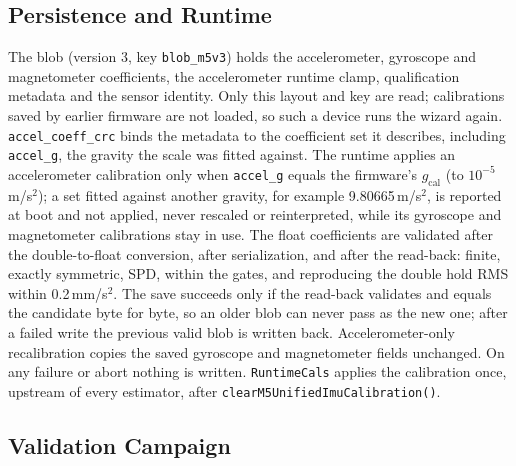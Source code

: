 \documentclass[conference]{IEEEtran}
\begin{document}
    \subsection{Persistence and Runtime}

    The blob (version 3, key \texttt{blob\_m5v3}) holds the accelerometer,
    gyroscope and magnetometer coefficients, the accelerometer runtime
    clamp, qualification metadata and the sensor identity. Only this layout
    and key are read; calibrations saved by earlier firmware are not loaded,
    so such a device runs the wizard again. \texttt{accel\_coeff\_crc} binds the metadata to the
    coefficient set it describes, including \texttt{accel\_g}, the gravity
    the scale was fitted against. The runtime applies an accelerometer
    calibration only when \texttt{accel\_g} equals the firmware's
    $g_\text{cal}$ (to $10^{-5}$\,m/s$^2$); a set fitted against another
    gravity, for example 9.80665\,m/s$^2$, is reported at boot and not
    applied, never rescaled or reinterpreted, while its gyroscope and
    magnetometer calibrations stay in use. The float coefficients are validated after
    the double-to-float conversion, after serialization, and after the
    read-back: finite, exactly symmetric, SPD, within the gates, and
    reproducing the double hold RMS within 0.2\,mm/s$^2$. The save succeeds
    only if the read-back validates and equals the candidate byte for byte,
    so an older blob can never pass as the new one; after a failed write the
    previous valid blob is written back. Accelerometer-only recalibration
    copies the saved gyroscope and magnetometer fields unchanged. On any
    failure or abort nothing is written. \texttt{RuntimeCals} applies the
    calibration once, upstream of every estimator, after
    \texttt{clearM5UnifiedImuCalibration()}.

    \subsection{Validation Campaign}
\end{document}
